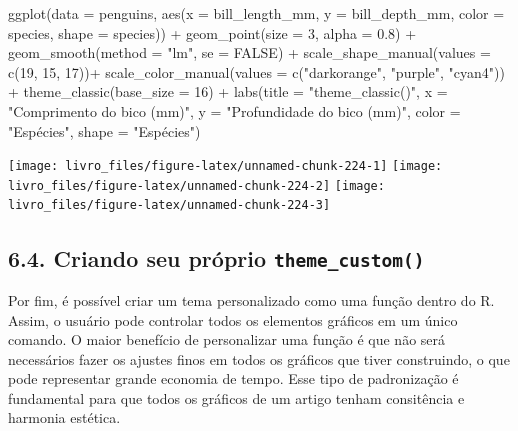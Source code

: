 \documentclass[
]{book}
\newenvironment{Shaded}{\begin{snugshade}}{\end{snugshade}}
\newcommand{\AttributeTok}[1]{\textcolor[rgb]{0.61,0.61,0.61}{#1}}
\newcommand{\ConstantTok}[1]{\textcolor[rgb]{0,0,0}{#1}}
\newcommand{\DecValTok}[1]{\textcolor[rgb]{0.06,0.06,0.06}{#1}}
\newcommand{\FloatTok}[1]{\textcolor[rgb]{0.06,0.06,0.06}{#1}}
\newcommand{\FunctionTok}[1]{\textcolor[rgb]{0,0,0}{#1}}
\newcommand{\NormalTok}[1]{#1}
\newcommand{\SpecialCharTok}[1]{\textcolor[rgb]{0,0,0}{#1}}
\newcommand{\StringTok}[1]{\textcolor[rgb]{0.5,0.5,0.5}{#1}}
\begin{document}
\begin{Shaded}
\begin{Highlighting}[]
\FunctionTok{ggplot}\NormalTok{(}\AttributeTok{data =}\NormalTok{ penguins, }
       \FunctionTok{aes}\NormalTok{(}\AttributeTok{x =}\NormalTok{ bill\_length\_mm, }
           \AttributeTok{y =}\NormalTok{ bill\_depth\_mm,}
           \AttributeTok{color =}\NormalTok{ species,}
           \AttributeTok{shape =}\NormalTok{ species)) }\SpecialCharTok{+}
  \FunctionTok{geom\_point}\NormalTok{(}\AttributeTok{size =} \DecValTok{3}\NormalTok{, }
             \AttributeTok{alpha =} \FloatTok{0.8}\NormalTok{) }\SpecialCharTok{+}
  \FunctionTok{geom\_smooth}\NormalTok{(}\AttributeTok{method =} \StringTok{"lm"}\NormalTok{, }\AttributeTok{se =} \ConstantTok{FALSE}\NormalTok{) }\SpecialCharTok{+}
  \FunctionTok{scale\_shape\_manual}\NormalTok{(}\AttributeTok{values =} \FunctionTok{c}\NormalTok{(}\DecValTok{19}\NormalTok{, }\DecValTok{15}\NormalTok{, }\DecValTok{17}\NormalTok{))}\SpecialCharTok{+}
  \FunctionTok{scale\_color\_manual}\NormalTok{(}\AttributeTok{values =} \FunctionTok{c}\NormalTok{(}\StringTok{"darkorange"}\NormalTok{, }\StringTok{"purple"}\NormalTok{, }\StringTok{"cyan4"}\NormalTok{)) }\SpecialCharTok{+}
  \FunctionTok{theme\_classic}\NormalTok{(}\AttributeTok{base\_size =} \DecValTok{16}\NormalTok{) }\SpecialCharTok{+}
  \FunctionTok{labs}\NormalTok{(}\AttributeTok{title =} \StringTok{"theme\_classic()"}\NormalTok{, }\AttributeTok{x =} \StringTok{"Comprimento do bico (mm)"}\NormalTok{, }\AttributeTok{y =} \StringTok{"Profundidade do bico (mm)"}\NormalTok{, }
       \AttributeTok{color =} \StringTok{"Espécies"}\NormalTok{, }\AttributeTok{shape =} \StringTok{"Espécies"}\NormalTok{) }
\end{Highlighting}
\end{Shaded}

\begin{center}\texttt{[image: livro\_files/figure-latex/unnamed-chunk-224-1]} \texttt{[image: livro\_files/figure-latex/unnamed-chunk-224-2]} \texttt{[image: livro\_files/figure-latex/unnamed-chunk-224-3]} \end{center}

\hypertarget{criando-seu-pruxf3prio-theme_custom}{%
\subsection{\texorpdfstring{6.4. Criando seu próprio \texttt{theme\_custom()}}{6.4. Criando seu próprio theme\_custom()}}\label{criando-seu-pruxf3prio-theme_custom}}

Por fim, é possível criar um tema personalizado como uma função dentro do R. Assim, o usuário pode controlar todos os elementos gráficos em um único comando. O maior benefício de personalizar uma função é que não será necessários fazer os ajustes finos em todos os gráficos que tiver construindo, o que pode representar grande economia de tempo. Esse tipo de padronização é fundamental para que todos os gráficos de um artigo tenham consitência e harmonia estética.
\end{document}
